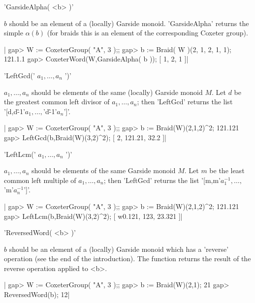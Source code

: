 
'GarsideAlpha( <b> )'

$b$ should be  an element of a (locally)  Garside monoid. 'GarsideAlpha'
returns the  simple $\alpha(b)$ (for  braids this  is an element  of the
corresponding Coxeter group).

|    gap>  W := CoxeterGroup( "A", 3 );;
    gap>  b := Braid( W )(2, 1, 2, 1, 1);
    121.1.1
    gap> CoxeterWord(W,GarsideAlpha( b ));
    [ 1, 2, 1 ]|


'LeftGcd(' $a_1,\ldots,a_n$ ')'

$a_1,\ldots,a_n$  should be elements  of the same  (locally) Garside monoid
$M$.  Let $d$ be the greatest common left divisor of $a_1,\ldots,a_n$; then
'LeftGcd' returns the list '[d,d\^-1\*'$a_1,\ldots,$'d\^-1\*'$a_n$']'.

|    gap>  W := CoxeterGroup( "A", 3 );;
    gap>  b := Braid(W)(2,1,2)^2;
    121.121
    gap> LeftGcd(b,Braid(W)(3,2)^2);
    [ 2, 121.21, 32.2 ]|


'LeftLcm(' $a_1,\ldots,a_n$ ')'

$a_1,\ldots,a_n$ should be elements of the same Garside monoid $M$. Let $m$
be  the  least  common  left  multiple  of $a_1,\ldots,a_n$; then 'LeftGcd'
returns the list '[m,m\*'$a_1^{-1},\ldots,$'m\*'$a_n^{-1}$']'.

|    gap>  W := CoxeterGroup( "A", 3 );;
    gap>  b := Braid(W)(2,1,2)^2;
    121.121
    gap> LeftLcm(b,Braid(W)(3,2)^2);
    [ w0.121, 123, 23.321 ]|


'ReversedWord( <b> )'

$b$  should be  an element  of a  (locally) Garside  monoid which  has a
'reverse'  operation (see  the end  of the  introduction). The  function
returns the result of the reverse operation applied to <b>.

|    gap>  W := CoxeterGroup( "A", 3 );;
    gap>  b := Braid(W)(2,1);
    21
    gap> ReversedWord(b);
    12|

